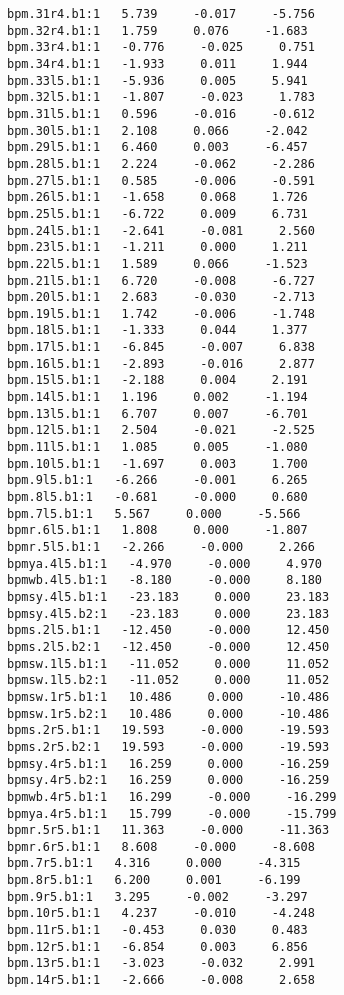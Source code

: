 \begin{verbatim}
bpm.31r4.b1:1   5.739     -0.017     -5.756
bpm.32r4.b1:1   1.759     0.076     -1.683
bpm.33r4.b1:1   -0.776     -0.025     0.751
bpm.34r4.b1:1   -1.933     0.011     1.944
bpm.33l5.b1:1   -5.936     0.005     5.941
bpm.32l5.b1:1   -1.807     -0.023     1.783
bpm.31l5.b1:1   0.596     -0.016     -0.612
bpm.30l5.b1:1   2.108     0.066     -2.042
bpm.29l5.b1:1   6.460     0.003     -6.457
bpm.28l5.b1:1   2.224     -0.062     -2.286
bpm.27l5.b1:1   0.585     -0.006     -0.591
bpm.26l5.b1:1   -1.658     0.068     1.726
bpm.25l5.b1:1   -6.722     0.009     6.731
bpm.24l5.b1:1   -2.641     -0.081     2.560
bpm.23l5.b1:1   -1.211     0.000     1.211
bpm.22l5.b1:1   1.589     0.066     -1.523
bpm.21l5.b1:1   6.720     -0.008     -6.727
bpm.20l5.b1:1   2.683     -0.030     -2.713
bpm.19l5.b1:1   1.742     -0.006     -1.748
bpm.18l5.b1:1   -1.333     0.044     1.377
bpm.17l5.b1:1   -6.845     -0.007     6.838
bpm.16l5.b1:1   -2.893     -0.016     2.877
bpm.15l5.b1:1   -2.188     0.004     2.191
bpm.14l5.b1:1   1.196     0.002     -1.194
bpm.13l5.b1:1   6.707     0.007     -6.701
bpm.12l5.b1:1   2.504     -0.021     -2.525
bpm.11l5.b1:1   1.085     0.005     -1.080
bpm.10l5.b1:1   -1.697     0.003     1.700
bpm.9l5.b1:1   -6.266     -0.001     6.265
bpm.8l5.b1:1   -0.681     -0.000     0.680
bpm.7l5.b1:1   5.567     0.000     -5.566
bpmr.6l5.b1:1   1.808     0.000     -1.807
bpmr.5l5.b1:1   -2.266     -0.000     2.266
bpmya.4l5.b1:1   -4.970     -0.000     4.970
bpmwb.4l5.b1:1   -8.180     -0.000     8.180
bpmsy.4l5.b1:1   -23.183     0.000     23.183
bpmsy.4l5.b2:1   -23.183     0.000     23.183
bpms.2l5.b1:1   -12.450     -0.000     12.450
bpms.2l5.b2:1   -12.450     -0.000     12.450
bpmsw.1l5.b1:1   -11.052     0.000     11.052
bpmsw.1l5.b2:1   -11.052     0.000     11.052
bpmsw.1r5.b1:1   10.486     0.000     -10.486
bpmsw.1r5.b2:1   10.486     0.000     -10.486
bpms.2r5.b1:1   19.593     -0.000     -19.593
bpms.2r5.b2:1   19.593     -0.000     -19.593
bpmsy.4r5.b1:1   16.259     0.000     -16.259
bpmsy.4r5.b2:1   16.259     0.000     -16.259
bpmwb.4r5.b1:1   16.299     -0.000     -16.299
bpmya.4r5.b1:1   15.799     -0.000     -15.799
bpmr.5r5.b1:1   11.363     -0.000     -11.363
bpmr.6r5.b1:1   8.608     -0.000     -8.608
bpm.7r5.b1:1   4.316     0.000     -4.315
bpm.8r5.b1:1   6.200     0.001     -6.199
bpm.9r5.b1:1   3.295     -0.002     -3.297
bpm.10r5.b1:1   4.237     -0.010     -4.248
bpm.11r5.b1:1   -0.453     0.030     0.483
bpm.12r5.b1:1   -6.854     0.003     6.856
bpm.13r5.b1:1   -3.023     -0.032     2.991
bpm.14r5.b1:1   -2.666     -0.008     2.658

\end{verbatim}
